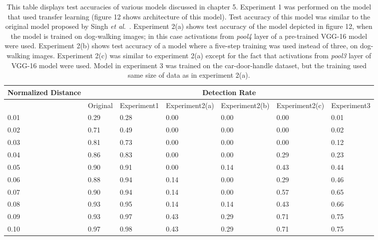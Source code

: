 \documentclass [11pt,letterpaper ,twoside ,openany ]{report}
\begin{document}
    \begin{table}[t]
    \centering
    \small
    \begin{tabular}{ | p{1.8cm} | p{1.8cm} | p{1.8cm} | p{2.2cm} | p{2.2cm} | p{2.2cm} |  p{1.8cm}| }
    \hline
    Normalized Distance &  \multicolumn{6}{|c|}{Detection Rate} \\ \hline
    & Original & Experiment1 & Experiment2(a) & Experiment2(b) & Experiment2(c) & Experiment3 \\ \hline
    0.01 & 0.29 & 0.28 & 0.00 & 0.00 & 0.00 & 0.01 \\ \hline
    0.02 & 0.71 & 0.49 & 0.00 & 0.00 & 0.00 & 0.02 \\ \hline
    0.03 & 0.81 & 0.73 & 0.00 & 0.00 & 0.00 & 0.12 \\ \hline
    0.04 & 0.86 & 0.83 & 0.00 & 0.00 & 0.29 & 0.23 \\ \hline
    0.05 & 0.90 & 0.91 & 0.00 & 0.14 & 0.43 & 0.44 \\ \hline
    0.06 & 0.88 & 0.94 & 0.14 & 0.00 & 0.29 & 0.46 \\ \hline
    0.07 & 0.90 & 0.94 & 0.14 & 0.00 & 0.57 & 0.65 \\ \hline
    0.08 & 0.93 & 0.95 & 0.14 & 0.14 & 0.43 & 0.66 \\ \hline
    0.09 & 0.93 & 0.97 & 0.43 & 0.29 & 0.71 & 0.75 \\ \hline
    0.10 & 0.97 & 0.98 & 0.43 & 0.29 & 0.71 & 0.75 \\ \hline
    \end{tabular}
    \caption{This table displays test accuracies of various models discussed in chapter 5. Experiment 1 was performed on the model that used transfer learning (figure 12 shows architecture of this model). Test accuracy of this model was similar to the original model proposed by Singh \textit{et al}.\ \cite{Singh_2016_CVPR}. Experiment 2(a) shows test accuracy of the model depicted in figure 12, when the model is trained on dog-walking images; in this case activations from \textit{pool4} layer of a pre-trained VGG-16 \cite{simonyan2014very} model were used. Experiment 2(b) shows test accuracy of a model where a five-step training was used instead of three, on dog-walking images. Experiment 2(c) was similar to experiment 2(a) except for the fact that activations from \textit{pool3} layer of VGG-16 model \cite{simonyan2014very} were used. Model in experiment 3 was trained on the car-door-handle dataset, but the training used same size of data as in experiment 2(a).}
    \end{table}
\end{document}
